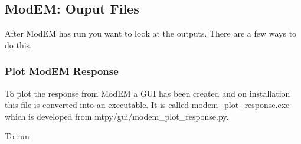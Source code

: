 \subsection{ModEM: Ouput Files}
\label{sec:modeling.modem.output}

After ModEM has run you want to look at the outputs.  There are a few ways to do this.  

\subsubsection{Plot ModEM Response}
\label{sec:modeling.modem.plot_response}

To plot the response from ModEM a GUI has been created and on installation this file is converted into an executable.  It is called modem_plot_response.exe which is developed from mtpy/gui/modem_plot_response.py.

To run

